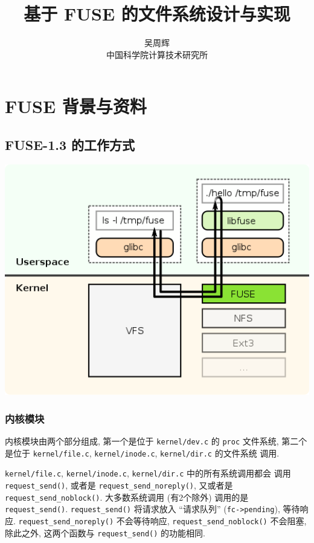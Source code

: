 \documentclass[nofonts, titlepage]{ctexart}
\title{基于 FUSE 的文件系统设计与实现}
\author{吴周辉 \\ 中国科学院计算技术研究所}
\begin{document}
\maketitle
\tableofcontents

\section{FUSE 背景与资料}\label{fuse-ux80ccux666fux4e0eux8d44ux6599}

\subsection{FUSE-1.3 的工作方式}

\begin{center}
\includegraphics[width=14cm]{./images/./FUSE_structure.svg.png}
\label{fig:fuse_structure}
\end{center}

\subsubsection{内核模块}\label{ux5185ux6838ux6a21ux5757}

内核模块由两个部分组成, 第一个是位于 \texttt{kernel/dev.c} 的
\texttt{proc} 文件系统, 第二个是位于 \texttt{kernel/file.c},
\texttt{kernel/inode.c}, \texttt{kernel/dir.c} 的文件系统 调用.

\texttt{kernel/file.c}, \texttt{kernel/inode.c}, \texttt{kernel/dir.c}
中的所有系统调用都会 调用 \texttt{request\_send()}, 或者是
\texttt{request\_send\_noreply()}, 又或者是
\texttt{request\_send\_noblock()}. 大多数系统调用 (有2个除外) 调用的是
\texttt{request\_send()}. \texttt{request\_send()} 将请求放入
``请求队列'' (\texttt{fc-\textgreater{}pending}), 等待响应.
\texttt{request\_send\_noreply()} 不会等待响应,
\texttt{request\_send\_noblock()} 不会阻塞, 除此之外, 这两个函数与
\texttt{request\_send()} 的功能相同.
\end{document}
